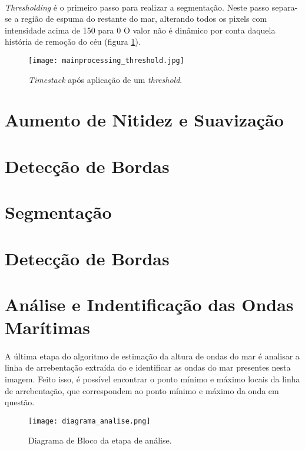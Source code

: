 \paragraph{}\textit{Thresholding} é o primeiro passo para realizar a segmentação. Neste passo separa-se a região de espuma do restante do mar, alterando todos os pixels com intensidade acima de 150 para 0 O valor não é dinâmico por conta daquela história de remoção do céu (figura \ref{FigThreshold}). 
\begin{figure}[h]
\begin{center}
  \texttt{[image: mainprocessing\_threshold.jpg]}
  \caption[\small{\textit{Timestack} após aplicação de um \textit{threshold}.}]{\label{FigThreshold} \small{\textit{Timestack} após aplicação de um \textit{threshold}.}}
\end{center}
\end{figure}
\section{Aumento de Nitidez e Suavização}
\section{Detecção de Bordas}
\section{Segmentação}
\section{Detecção de Bordas}
\section{Análise e Indentificação das Ondas Marítimas}
\paragraph{}A última etapa do algoritmo de estimação da altura de ondas do mar é analisar a linha de arrebentação extraída do \timestack e identificar as ondas do mar presentes nesta imagem. Feito isso, é possível encontrar o ponto mínimo e máximo locais da linha de arrebentação, que correspondem ao ponto mínimo e máximo da onda em questão.
\begin{figure}[h]
\begin{center}
  \texttt{[image: diagrama\_analise.png]}
  \caption[\small{Diagrama de Bloco da etapa de análise. Fonte: Autor}]{\label{FigDiagramaAnalise} \small{Diagrama de Bloco da etapa de análise.}}
\end{center}
\end{figure}
